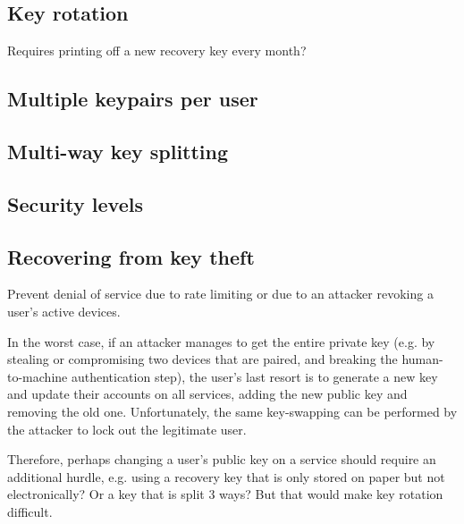 \subsection{Key rotation}\label{sec:rotation}

Requires printing off a new recovery key every month?

\subsection{Multiple keypairs per user}


\subsection{Multi-way key splitting}
\subsection{Security levels}



\subsection{Recovering from key theft}

Prevent denial of service due to rate limiting or due to an attacker revoking a user's active
devices.

In the worst case, if an attacker manages to get the entire private key (e.g. by stealing or
compromising two devices that are paired, and breaking the human-to-machine authentication step),
the user's last resort is to generate a new key and update their accounts on all services, adding
the new public key and removing the old one. Unfortunately, the same key-swapping can be performed
by the attacker to lock out the legitimate user.

Therefore, perhaps changing a user's public key on a service should require an additional hurdle,
e.g. using a recovery key that is only stored on paper but not electronically? Or a key that is
split 3 ways? But that would make key rotation difficult.
